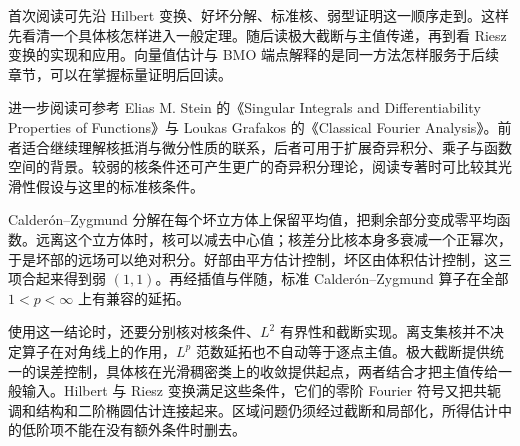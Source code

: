 \ProseParagraphBreak

首次阅读可先沿 Hilbert 变换、好坏分解、标准核、弱型证明这一顺序走到。这样先看清一个具体核怎样进入一般定理。随后读极大截断与主值传递，再到看 Riesz 变换的实现和应用。向量值估计与 BMO 端点解释的是同一方法怎样服务于后续章节，可以在掌握标量证明后回读。

\ProseParagraphBreak

进一步阅读可参考 Elias M. Stein 的《Singular Integrals and Differentiability Properties of Functions》\cite{Stein1970Singular}与 Loukas Grafakos 的《Classical Fourier Analysis》\cite{Grafakos2014Classical}。前者适合继续理解核抵消与微分性质的联系，后者可用于扩展奇异积分、乘子与函数空间的背景。较弱的核条件还可产生更广的奇异积分理论，阅读专著时可比较其光滑性假设与这里的标准核条件。







\begin{chaptersummary}
Calderón--Zygmund 分解在每个坏立方体上保留平均值，把剩余部分变成零平均函数。远离这个立方体时，核可以减去中心值；核差分比核本身多衰减一个正幂次，于是坏部的远场可以绝对积分。好部由平方估计控制，坏区由体积估计控制，这三项合起来得到弱 \((1,1)\)。再经插值与伴随，标准 Calderón--Zygmund 算子在全部 \(1<p<\infty\) 上有兼容的延拓。

\ProseParagraphBreak

使用这一结论时，还要分别核对核条件、\(L^2\) 有界性和截断实现。离支集核并不决定算子在对角线上的作用，\(L^p\) 范数延拓也不自动等于逐点主值。极大截断提供统一的误差控制，具体核在光滑稠密类上的收敛提供起点，两者结合才把主值传给一般输入。Hilbert 与 Riesz 变换满足这些条件，它们的零阶 Fourier 符号又把共轭调和结构和二阶椭圆估计连接起来。区域问题仍须经过截断和局部化，所得估计中的低阶项不能在没有额外条件时删去。
\end{chaptersummary}

\BookExercises


